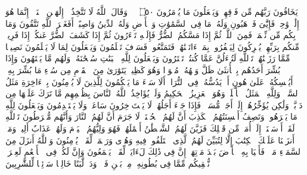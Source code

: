 \startbuffer[\q:16:50]
یَخَافُونَ رَبَّهُم مِّن فَوۡقِهِمۡ وَیَفۡعَلُونَ مَا یُؤۡمَرُونَ ۝٥٠ ۩%
\stopbuffer
\startbuffer[\q:16:51]
۞ وَقَالَ ٱللَّهُ لَا تَتَّخِذُوۤا۟ إِلَٰهَیۡنِ ٱثۡنَیۡنِۖ إِنَّمَا هُوَ إِلَٰهࣱ وَٰحِدࣱ فَإِیَّٰیَ فَٱرۡهَبُونِ%
\stopbuffer
\startbuffer[\q:16:52]
وَلَهُۥ مَا فِی ٱلسَّمَٰوَٰتِ وَٱلۡأَرۡضِ وَلَهُ ٱلدِّینُ وَاصِبًاۚ أَفَغَیۡرَ ٱللَّهِ تَتَّقُونَ%
\stopbuffer
\startbuffer[\q:16:53]
وَمَا بِكُم مِّن نِّعۡمَةࣲ فَمِنَ ٱللَّهِۖ ثُمَّ إِذَا مَسَّكُمُ ٱلضُّرُّ فَإِلَیۡهِ تَجۡءَرُونَ%
\stopbuffer
\startbuffer[\q:16:54]
ثُمَّ إِذَا كَشَفَ ٱلضُّرَّ عَنكُمۡ إِذَا فَرِیقࣱ مِّنكُم بِرَبِّهِمۡ یُشۡرِكُونَ%
\stopbuffer
\startbuffer[\q:16:55]
لِیَكۡفُرُوا۟ بِمَاۤ ءَاتَیۡنَٰهُمۡۚ فَتَمَتَّعُوا۟ فَسَوۡفَ تَعۡلَمُونَ%
\stopbuffer
\startbuffer[\q:16:56]
وَیَجۡعَلُونَ لِمَا لَا یَعۡلَمُونَ نَصِیبࣰا مِّمَّا رَزَقۡنَٰهُمۡۗ تَٱللَّهِ لَتُسۡءَلُنَّ عَمَّا كُنتُمۡ تَفۡتَرُونَ%
\stopbuffer
\startbuffer[\q:16:57]
وَیَجۡعَلُونَ لِلَّهِ ٱلۡبَنَٰتِ سُبۡحَٰنَهُۥ وَلَهُم مَّا یَشۡتَهُونَ%
\stopbuffer
\startbuffer[\q:16:58]
وَإِذَا بُشِّرَ أَحَدُهُم بِٱلۡأُنثَىٰ ظَلَّ وَجۡهُهُۥ مُسۡوَدࣰّا وَهُوَ كَظِیمࣱ%
\stopbuffer
\startbuffer[\q:16:59]
یَتَوَٰرَىٰ مِنَ ٱلۡقَوۡمِ مِن سُوۤءِ مَا بُشِّرَ بِهِۦۤۚ أَیُمۡسِكُهُۥ عَلَىٰ هُونٍ أَمۡ یَدُسُّهُۥ فِی ٱلتُّرَابِۗ أَلَا سَاۤءَ مَا یَحۡكُمُونَ%
\stopbuffer
\startbuffer[\q:16:60]
لِلَّذِینَ لَا یُؤۡمِنُونَ بِٱلۡءَاخِرَةِ مَثَلُ ٱلسَّوۡءِۖ وَلِلَّهِ ٱلۡمَثَلُ ٱلۡأَعۡلَىٰۚ وَهُوَ ٱلۡعَزِیزُ ٱلۡحَكِیمُ%
\stopbuffer
\startbuffer[\q:16:61]
وَلَوۡ یُؤَاخِذُ ٱللَّهُ ٱلنَّاسَ بِظُلۡمِهِم مَّا تَرَكَ عَلَیۡهَا مِن دَاۤبَّةࣲ وَلَٰكِن یُؤَخِّرُهُمۡ إِلَىٰۤ أَجَلࣲ مُّسَمࣰّىۖ فَإِذَا جَاۤءَ أَجَلُهُمۡ لَا یَسۡتَءۡخِرُونَ سَاعَةࣰ وَلَا یَسۡتَقۡدِمُونَ%
\stopbuffer
\startbuffer[\q:16:62]
وَیَجۡعَلُونَ لِلَّهِ مَا یَكۡرَهُونَۚ وَتَصِفُ أَلۡسِنَتُهُمُ ٱلۡكَذِبَ أَنَّ لَهُمُ ٱلۡحُسۡنَىٰۚ لَا جَرَمَ أَنَّ لَهُمُ ٱلنَّارَ وَأَنَّهُم مُّفۡرَطُونَ%
\stopbuffer
\startbuffer[\q:16:63]
تَٱللَّهِ لَقَدۡ أَرۡسَلۡنَاۤ إِلَىٰۤ أُمَمࣲ مِّن قَبۡلِكَ فَزَیَّنَ لَهُمُ ٱلشَّیۡطَٰنُ أَعۡمَٰلَهُمۡ فَهُوَ وَلِیُّهُمُ ٱلۡیَوۡمَ وَلَهُمۡ عَذَابٌ أَلِیمࣱ%
\stopbuffer
\startbuffer[\q:16:64]
وَمَاۤ أَنزَلۡنَا عَلَیۡكَ ٱلۡكِتَٰبَ إِلَّا لِتُبَیِّنَ لَهُمُ ٱلَّذِی ٱخۡتَلَفُوا۟ فِیهِ وَهُدࣰى وَرَحۡمَةࣰ لِّقَوۡمࣲ یُؤۡمِنُونَ%
\stopbuffer
\startbuffer[\q:16:65]
وَٱللَّهُ أَنزَلَ مِنَ ٱلسَّمَاۤءِ مَاۤءࣰ فَأَحۡیَا بِهِ ٱلۡأَرۡضَ بَعۡدَ مَوۡتِهَاۤۚ إِنَّ فِی ذَٰلِكَ لَءَایَةࣰ لِّقَوۡمࣲ یَسۡمَعُونَ%
\stopbuffer
\startbuffer[\q:16:66]
وَإِنَّ لَكُمۡ فِی ٱلۡأَنۡعَٰمِ لَعِبۡرَةࣰۖ نُّسۡقِیكُم مِّمَّا فِی بُطُونِهِۦ مِنۢ بَیۡنِ فَرۡثࣲ وَدَمࣲ لَّبَنًا خَالِصࣰا سَاۤئِغࣰا لِّلشَّٰرِبِینَ%
